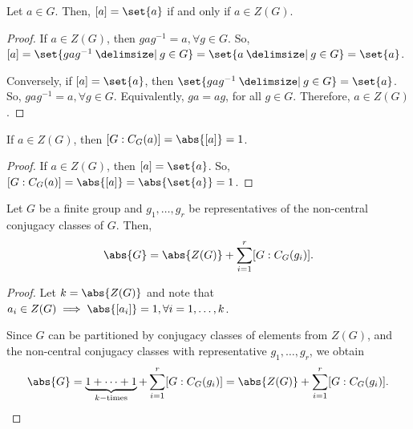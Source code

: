 \documentclass[11pt]{penrose}
\begin{document}
\begin{nlemma}
    Let $a \in G$. Then, $[a] = \set{a}$ if and only if $a \in Z(G)$.
\end{nlemma}
\begin{proof}
    If $a \in Z(G)$, then $g a g^{-1} = a, \forall g \in G$. So, $[a] = \set{g a g^{-1} \st g \in G} = \set{a \st g \in G} = \set{a}$.

    Conversely, if $[a] = \set{a}$, then $\set{g a g^{-1} \st g \in G} = \set{a}$. So, $g a g^{-1} = a, \forall g \in G$. Equivalently, $ga = ag$, for all $g \in G$. Therefore, $a \in Z(G)$.
\end{proof}

\begin{ncor}
    If $a \in Z(G)$, then $[G : C_{G}(a)] = \abs{ [a] } = 1$.
\end{ncor}
\begin{proof}
    If $a \in Z(G)$, then $[a] = \set{a}$. So, $[G : C_{G}(a)] = \abs{[a]} = \abs{\set{a}} = 1$.
\end{proof}

\begin{nthm}
    Let $G$ be a finite group and $g_{1}, \dots, g_{r}$ be representatives of the non-central conjugacy classes of $G$. Then,
    \begin{equation*}
        \abs{G} = \abs{Z(G)} + \sum_{i=1}^{r} [G : C_{G}(g_{i})].
    \end{equation*}
\end{nthm}
\begin{proof}
    Let $k = \abs{Z(G)}$ and note that $a_{i} \in Z(G) \implies \abs{[a_{i}]} = 1, \forall i=1,\dots,k$.

    Since $G$ can be partitioned by conjugacy classes of elements from $Z(G)$, and the non-central conjugacy classes with representative $g_{1}, \dots, g_{r}$, we obtain   
    \begin{equation*}
        \abs{G}
        = \underbrace{1 + \dots + 1}_{k-\text{times}} + \sum_{i=1}^{r} [G : C_{G}(g_{i})]
        = \abs{Z(G)} + \sum_{i=1}^{r} [G : C_{G}(g_{i})].\qedhere
    \end{equation*}
\end{proof}
\end{document}
